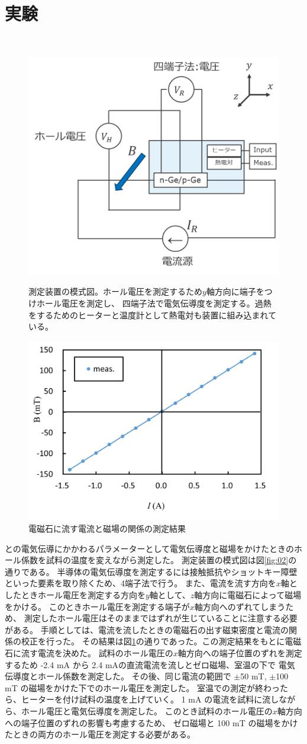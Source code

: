\documentclass[11pt,dvipdfmx,a4paper]{jsarticle}
\numberwithin{equation}{section}
\begin{document}
\section{実験}
　　　　　　　　　　　　　　　　　　　　　　　　　　　　　　　　　
\begin{figure}
	\centering
	\includegraphics[width=0.4\columnwidth]{fig/fig02.png}
	\caption{\small{測定装置の模式図。ホール電圧を測定するため\(y\)軸方向に端子をつけホール電圧を測定し、
	四端子法で電気伝導度を測定する。過熱をするためのヒーターと温度計として熱電対も装置に組み込まれている。}}
	\label{fig:02}
	\includegraphics[width=0.4\columnwidth]{graph/graph02.png}
	\caption{電磁石に流す電流と磁場の関係の測定結果}
	\label{graph:02}
\end{figure}
との電気伝導にかかわるパラメーターとして電気伝導度と磁場をかけたときのホール係数を試料の温度を変えながら測定した。
測定装置の模式図は図\ref{fig:02}の通りである。
半導体の電気伝導度を測定するには接触抵抗やショットキー障壁といった要素を取り除くため、4端子法で行う。
また、電流を流す方向を\(x\)軸としたときホール電圧を測定する方向を\(y\)軸として、\(z\)軸方向に電磁石によって磁場をかける。
このときホール電圧を測定する端子が\(x\)軸方向へのずれてしまうため、
測定したホール電圧はそのままではずれが生じていることに注意する必要がある。
手順としては、電流を流したときの電磁石の出す磁束密度と電流の関係の校正を行った。
その結果は図\ref{graph:02}の通りであった。この測定結果をもとに電磁石に流す電流を決めた。
試料のホール電圧の\(x\)軸方向への端子位置のずれを測定するため
-2.4 mA から 2.4 mAの直流電流を流しとゼロ磁場、室温の下で
電気伝導度とホール係数を測定した。
その後、同じ電流の範囲で \(\pm\)50 mT, \(\pm\)100 mT の磁場をかけた下でのホール電圧を測定した。
室温での測定が終わったら、ヒーターを付け試料の温度を上げていく。
1 mA の電流を試料に流しながら、ホール電圧と電気伝導度を測定した。
このとき試料のホール電圧の\(x\)軸方向への端子位置のずれの影響も考慮するため、
ゼロ磁場と 100 mT の磁場をかけたときの両方のホール電圧を測定する必要がある。
\end{document}
